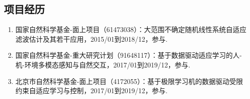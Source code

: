 \begin{publications}{99}
\section*{项目经历}
\begin{enumerate}
\item 国家自然科学基金-面上项目（61473038）：大范围不确定随机线性系统自适应滤波估计及其若干应用，2015/01到2018/12，参与.
\item 国家自然科学基金-重大研究计划（91648117）：基于数据驱动适应学习的人-机-环境多模态感知与自然交互，2017/01到2019/12，参与.
\item 北京市自然科学基金-面上项目（4172055）：基于极限学习机的数据驱动受限约束自适应学习与控制，2017/01到2019/12，参与.
\end{enumerate}
\end{publications}


